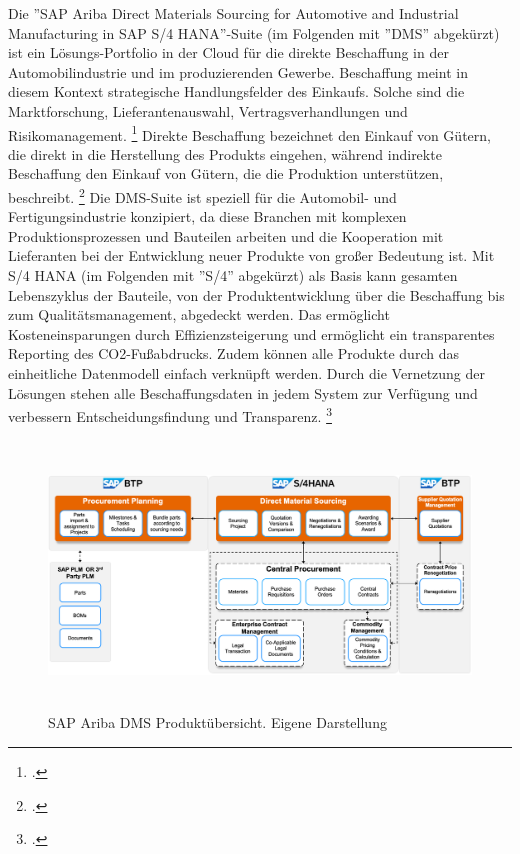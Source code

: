 Die ''SAP Ariba Direct Materials Sourcing for Automotive and Industrial Manufacturing in SAP S/4 HANA''-Suite (im Folgenden mit ''DMS'' abgekürzt) ist ein Lösungs-Portfolio in der Cloud für die direkte Beschaffung in der Automobilindustrie und im produzierenden Gewerbe. Beschaffung meint in diesem Kontext strategische Handlungsfelder des Einkaufs. Solche sind \zB die Marktforschung, Lieferantenauswahl, Vertragsverhandlungen und Risikomanagement. \footcite[Vgl.][S. 541]{theorie_digitale_transformation_beschaffung_automobilindustrie_2019} Direkte Beschaffung bezeichnet den Einkauf von Gütern, die direkt in die Herstellung des Produkts eingehen, während indirekte Beschaffung den Einkauf von Gütern, die die Produktion unterstützen, beschreibt. \footcite[Vgl.][S. 541]{theorie_digitale_transformation_beschaffung_automobilindustrie_2019} Die DMS-Suite ist speziell für die Automobil- und Fertigungsindustrie konzipiert, da diese Branchen mit komplexen Produktionsprozessen und Bauteilen arbeiten und die Kooperation mit Lieferanten bei der Entwicklung neuer Produkte von gro\ss er Bedeutung ist. Mit S/4 HANA (im Folgenden mit ''S/4'' abgekürzt) als Basis kann gesamten Lebenszyklus der Bauteile, von der Produktentwicklung über die Beschaffung bis zum Qualitätsmanagement, abgedeckt werden. Das ermöglicht Kosteneinsparungen durch Effizienzsteigerung und ermöglicht ein transparentes Reporting des CO2-Fu\ss abdrucks. Zudem können alle Produkte durch das einheitliche Datenmodell einfach verknüpft werden. Durch die Vernetzung der Lösungen stehen alle Beschaffungsdaten in jedem System zur Verfügung und verbessern Entscheidungsfindung und Transparenz. \footcite[Vgl.][]{theorie_sap_webseite_dms_übersicht_2024}

\begin{figure}[H]
    \centering
    \includegraphics[height=7.1cm]{Bilder/Direct_Material_Sourcing_Overview3.png}
    \caption[SAP Ariba DMS Suite Produktübersicht]{SAP Ariba DMS Produktübersicht. Eigene Darstellung}
    \label{fig:Direct_Material_Sourcing_Overview3}
\end{figure}

